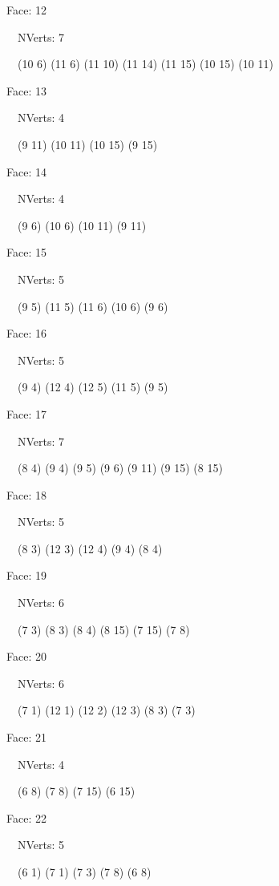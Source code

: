 \documentclass{article}
\begin{document}
{\footnotesize 

Face: 12

\   \    NVerts: 7

 \   \   (10 6) (11 6) (11 10) (11 14) (11 15) (10 15) (10 11)}

{\footnotesize 

Face: 13

\   \    NVerts: 4

 \   \   (9 11) (10 11) (10 15) (9 15)}

{\footnotesize 

Face: 14

\   \    NVerts: 4

 \   \   (9 6) (10 6) (10 11) (9 11)}

{\footnotesize 

Face: 15

\   \    NVerts: 5

 \   \   (9 5) (11 5) (11 6) (10 6) (9 6)}

{\footnotesize 

Face: 16

\   \    NVerts: 5

 \   \   (9 4) (12 4) (12 5) (11 5) (9 5)}

{\footnotesize 

Face: 17

\   \    NVerts: 7

 \   \   (8 4) (9 4) (9 5) (9 6) (9 11) (9 15) (8 15)}

{\footnotesize 

Face: 18

\   \    NVerts: 5

 \   \   (8 3) (12 3) (12 4) (9 4) (8 4)}

{\footnotesize 

Face: 19

\   \    NVerts: 6

 \   \   (7 3) (8 3) (8 4) (8 15) (7 15) (7 8)}

{\footnotesize 

Face: 20

\   \    NVerts: 6

 \   \   (7 1) (12 1) (12 2) (12 3) (8 3) (7 3)}

{\footnotesize 

Face: 21

\   \    NVerts: 4

 \   \   (6 8) (7 8) (7 15) (6 15)}

{\footnotesize 

Face: 22

\   \    NVerts: 5

 \   \   (6 1) (7 1) (7 3) (7 8) (6 8)}
\end{document}
